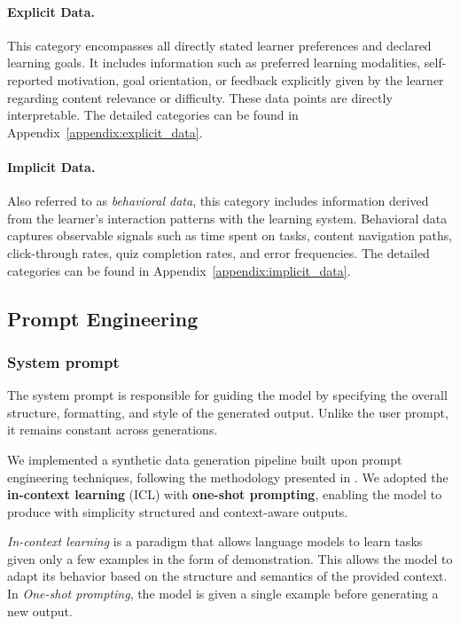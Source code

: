 \documentclass[sigconf]{acmart}
\begin{document}
\paragraph{Explicit Data.}  
This category encompasses all directly stated learner preferences and declared learning goals. It includes information such as preferred learning modalities, self-reported motivation, goal orientation, or feedback explicitly given by the learner regarding content relevance or difficulty. These data points are directly interpretable. The detailed categories can be found in Appendix~\ref{appendix:explicit_data}.

\paragraph{Implicit Data.}  
Also referred to as \textit{behavioral data}, this category includes information derived from the learner's interaction patterns with the learning system. Behavioral data captures observable signals such as time spent on tasks, content navigation paths, click-through rates, quiz completion rates, and error frequencies. The detailed categories can be found in Appendix~\ref{appendix:implicit_data}.

\subsection{Prompt Engineering}

\subsubsection{System prompt} The system prompt is responsible for guiding the model by specifying the overall structure, formatting, and style of the generated output. Unlike the user prompt, it remains constant across generations.

We implemented a synthetic data generation pipeline built upon prompt engineering techniques, following the methodology presented in \cite{sahoo2025systematicsurveypromptengineering}. We adopted the   \textbf{in-context learning} (ICL) \cite{dong2024surveyincontextlearning} with \textbf{one-shot prompting}, enabling the model to produce with simplicity structured and context-aware outputs. 

\textit{In-context learning} is a paradigm that allows language models to learn tasks given only a few examples in the form of demonstration. This allows the model to adapt its behavior based on the structure and semantics of the provided context. In \textit{One-shot prompting}, the model is given a single example before generating a new output.
\end{document}
